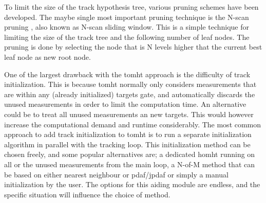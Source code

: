 To limit the size of the \gls{track hypothesis tree}, various pruning schemes have been developed. The maybe single most important pruning technique is the N-scan pruning \cite{Blackman2001}, also known as N-scan sliding window. This is a simple technique for limiting the size of the track tree and the following number of leaf nodes. The pruning is done by selecting the node that is N levels higher that the current best leaf node as new root node.

One of the largest drawback with the \gls{tomht} approach is the difficulty of track initialization. This is because \gls{tomht} normally only considers \glspl{measurement} that are within any (already initialized) \glspl{target} \gls{gate}, and automatically discards the unused \glspl{measurement} in order to limit the computation time. An alternative could be to treat all unused measurements an new targets. This would however increase the computational demand and runtime considerably. The most common approach to add track initialization to \gls{tomht} is to run a separate initialization algorithm in parallel with the tracking loop. This initialization method can be chosen freely, and some popular alternatives are; a dedicated \gls{homht} running on all or the unused \glspl{measurement} from the main loop, a N-of-M method that can be based on either nearest neighbour or \gls{pdaf}/\gls{jpdaf} or simply a manual initialization by the user. The options for this aiding module are endless, and the specific situation will influence the choice of method.